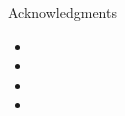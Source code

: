 
\begin{frame}[t]{Acknowledgments}
    \footnotesize
    \begin{itemize}
      \item 
      \item 
      \item 
      \item 
    \end{itemize}
    
\end{frame}